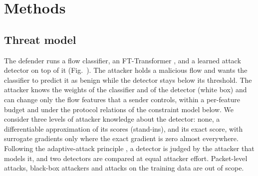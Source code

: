 \section*{Methods}
\label{sec:methods}

\subsection*{Threat model}
\label{sec:threat}
The defender runs a flow classifier, an FT-Transformer \cite{gorishniy2021}, and a learned attack detector on top of
it (Fig.~\mainFigPipeline).
The attacker holds a malicious flow and wants the classifier to predict it as benign while the detector stays below its
threshold.
The attacker knows the weights of the classifier and of the detector (white box) and can change only the flow features
that a sender controls, within a per-feature budget and under the protocol relations of the constraint model below.
We consider three levels of attacker knowledge about the detector: none, a differentiable approximation of its scores
(stand-ins), and its exact score, with surrogate gradients only where the exact gradient is zero almost everywhere.
Following the adaptive-attack principle \cite{tramer2020,carlini2017}, a detector is judged by the attacker that models
it, and two detectors are compared at equal attacker effort.
Packet-level attacks, black-box attackers and attacks on the training data are out of scope.

